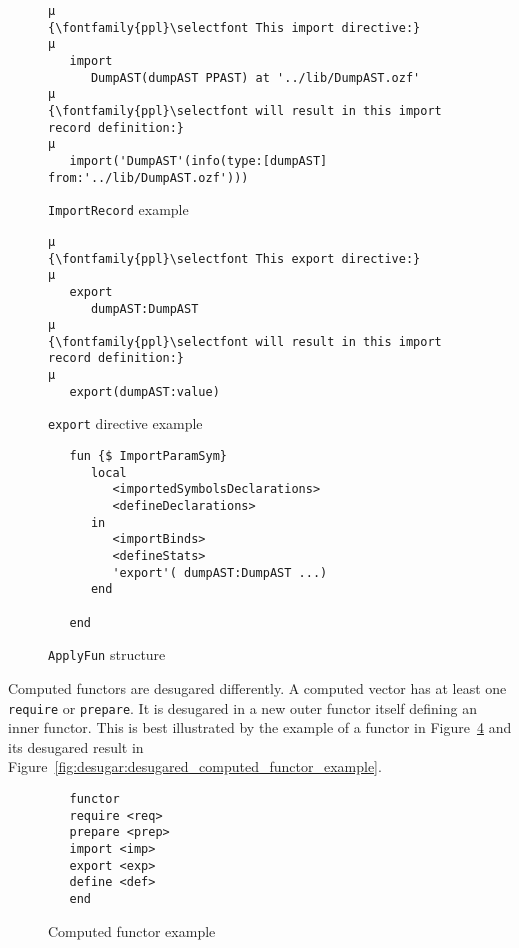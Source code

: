 \documentclass[a4paper]{memoir}
\begin{document}
\begin{figure}[ht]
\begin{lstlisting}
µ
{\fontfamily{ppl}\selectfont This import directive:}
µ
   import
      DumpAST(dumpAST PPAST) at '../lib/DumpAST.ozf'
µ
{\fontfamily{ppl}\selectfont will result in this import record definition:}
µ
   import('DumpAST'(info(type:[dumpAST] from:'../lib/DumpAST.ozf')))
\end{lstlisting}
\caption{\lstinline!ImportRecord! example}
\label{fig:desugar:import_record_example}
\end{figure}

\begin{figure}[h]
\begin{lstlisting}
µ
{\fontfamily{ppl}\selectfont This export directive:}
µ
   export
      dumpAST:DumpAST
µ
{\fontfamily{ppl}\selectfont will result in this import record definition:}
µ
   export(dumpAST:value)
\end{lstlisting}
\caption{\lstinline!export! directive example}
\label{fig:desugar:export_record}
\end{figure}

\begin{figure}[h]
\begin{lstlisting}
   fun {$ ImportParamSym}
      local
         <importedSymbolsDeclarations>
         <defineDeclarations>
      in
         <importBinds>
         <defineStats>
         'export'( dumpAST:DumpAST ...)
      end
   
   end
\end{lstlisting}
\caption{\lstinline!ApplyFun! structure}
\label{fig:desugar:apply_fun}
\end{figure}


Computed functors are desugared differently. A computed vector has at least one
\lstinline!require! or \lstinline!prepare!. It is desugared in a new outer
functor itself defining an inner functor.  This is best illustrated by the
example of a functor in Figure~\ref{fig:desugar:computed_functor_example} and
its desugared result in
Figure~\ref{fig:desugar:desugared_computed_functor_example}.

\begin{figure}[ht]
\begin{lstlisting}
   functor
   require <req>
   prepare <prep>
   import <imp>
   export <exp>
   define <def>
   end
\end{lstlisting}
\caption{Computed functor example}
\label{fig:desugar:computed_functor_example}
\end{figure}
\end{document}
